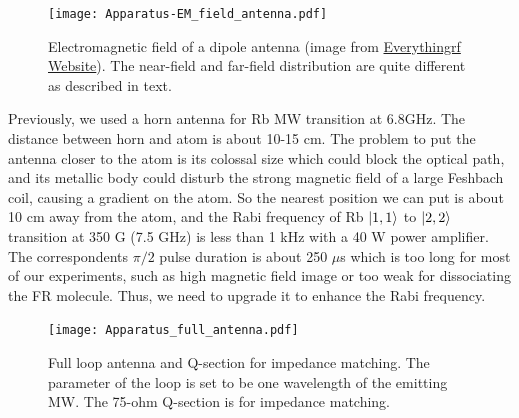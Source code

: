 \begin{figure}[htb]
\begin{center}
\texttt{[image: Apparatus-EM\_field\_antenna.pdf]}
\end{center}
\caption[Electromagnetic field of a dipole antenna]{Electromagnetic field of a dipole antenna (image from \href{https://www.everythingrf.com/community/what-is-the-difference-between-a-monopole-and-dipole-antenna}{Everythingrf Website}). The near-field and far-field distribution are quite different as described in text.}  
\label{antenna_EM}
\end{figure}

Previously, we used a horn antenna for Rb MW transition at 6.8GHz. The distance between horn and atom is about 10-15 cm. The problem to put the antenna closer to the atom is its colossal size which could block the optical path, and its metallic body could disturb the strong magnetic field of a large Feshbach coil, causing a gradient on the atom. So the nearest position we can put is about 10 cm away from the atom, and the Rabi frequency of Rb $\ket{1,1}$ to $\ket{2,2}$ transition at 350 G (7.5 GHz) is less than 1 kHz with a 40 W power amplifier. The correspondents \(\pi/2\) pulse duration is about 250 $\mu$s which is too long for most of our experiments, such as high magnetic field image or too weak for dissociating the FR molecule. Thus, we need to upgrade it to enhance the Rabi frequency.

\begin{figure}[htb]
\begin{center}
\texttt{[image: Apparatus\_full\_antenna.pdf]}
\end{center}
\caption[Full loop antenna and Q-section for impedance matching]{Full loop antenna and Q-section for impedance matching. The parameter of the loop is set to be one wavelength of the emitting MW. The 75-ohm Q-section is for impedance matching.}  
\label{Apparatus_full_antenna}
\end{figure}

